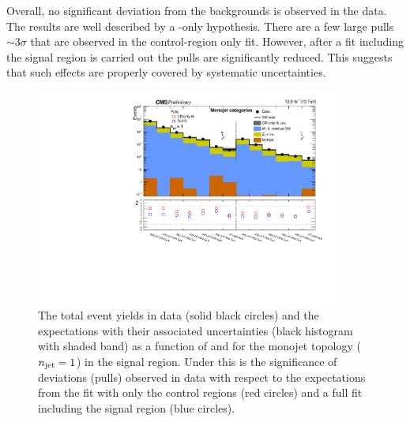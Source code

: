 Overall, no significant deviation from the \SM backgrounds is observed
in the data. The results are well described by a \SM-only hypothesis.
There are a few large pulls $\sim 3\sigma$ that are observed in the
control-region only fit. However, after a fit including the signal
region is carried out the pulls are significantly reduced. This
suggests that such effects are properly covered by systematic
uncertainties.

\begin{figure}[!htb]
  \begin{center}
    \includegraphics[width=0.9\textwidth]{figs/analysis/results/summaryPlot_Monojet_prefit_overlay_fit_b}
    \caption{The total event yields in data (solid black circles)
      and the \SM expectations with their associated uncertainties (black
      histogram with shaded band) as a function of
      \nb and \HT for the monojet topology ($n_{\text{jet}} = 1$) in the
      signal region. Under this is the significance of deviations
      (pulls) observed in data with respect to the \SM expectations
      from the fit with only the control regions (red circles) and a
      full fit including the signal region (blue circles).}
    \label{fig:mono}
  \end{center}
\end{figure}

